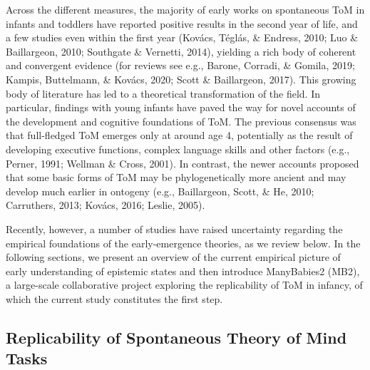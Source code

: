 \documentclass[
  english,
  man,floatsintext]{apa6}
\begin{document}
Across the different measures, the majority of early works on spontaneous ToM in infants and toddlers have reported positive results in the second year of life, and a few studies even within the first year (Kovács, Téglás, \& Endress, 2010; Luo \& Baillargeon, 2010; Southgate \& Vernetti, 2014), yielding a rich body of coherent and convergent evidence (for reviews see e.g., Barone, Corradi, \& Gomila, 2019; Kampis, Buttelmann, \& Kovács, 2020; Scott \& Baillargeon, 2017). This growing body of literature has led to a theoretical transformation of the field. In particular, findings with young infants have paved the way for novel accounts of the development and cognitive foundations of ToM. The previous consensus was that full-fledged ToM emerges only at around age 4, potentially as the result of developing executive functions, complex language skills and other factors (e.g., Perner, 1991; Wellman \& Cross, 2001). In contrast, the newer accounts proposed that some basic forms of ToM may be phylogenetically more ancient and may develop much earlier in ontogeny (e.g., Baillargeon, Scott, \& He, 2010; Carruthers, 2013; Kovács, 2016; Leslie, 2005).

Recently, however, a number of studies have raised uncertainty regarding the empirical foundations of the early-emergence theories, as we review below. In the following sections, we present an overview of the current empirical picture of early understanding of epistemic states and then introduce ManyBabies2 (MB2), a large-scale collaborative project exploring the replicability of ToM in infancy, of which the current study constitutes the first step.

\hypertarget{replicability-of-spontaneous-theory-of-mind-tasks}{%
\subsection{Replicability of Spontaneous Theory of Mind Tasks}\label{replicability-of-spontaneous-theory-of-mind-tasks}}
\end{document}
